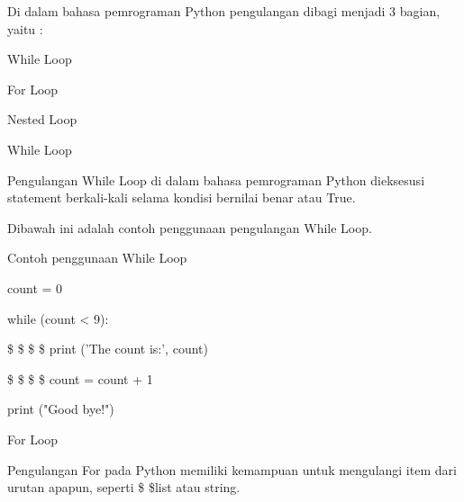 Di dalam bahasa pemrograman Python pengulangan dibagi menjadi 3 bagian, yaitu : \par
\noindent 
While Loop \par
\noindent 
For Loop \par
\noindent 
Nested Loop \par
\noindent 
\vspace{\baselineskip}
\vspace{\baselineskip}
\vspace{12pt}
\noindent 
While Loop \par
\noindent 
Pengulangan While Loop di dalam bahasa pemrograman Python dieksesusi statement berkali-kali selama kondisi bernilai benar atau True. \par
\noindent 
\vspace{\baselineskip}
\vspace{\baselineskip}
Dibawah ini adalah contoh penggunaan pengulangan While Loop. \par
\noindent 
\vspace{\baselineskip}
\vspace{12pt}
\noindent 
Contoh penggunaan While Loop \par
\noindent 
\vspace{\baselineskip}
\vspace{\baselineskip}
count = 0 \par
\noindent 
\vspace{\baselineskip}
while (count < 9): \par
\noindent 
\vspace{\baselineskip}
 \$  \$  \$  \$ print ('The count is:', count) \par
\noindent 
\vspace{\baselineskip}
 \$  \$  \$  \$ count = count + 1 \par
\noindent 
\vspace{\baselineskip}
\vspace{\baselineskip}
print ("Good bye!") \par
\noindent 
\vspace{\baselineskip}
\vspace{\baselineskip}
\vspace{\baselineskip}
\vspace{12pt}
\noindent 
For Loop \par
\noindent 
Pengulangan For pada Python memiliki kemampuan untuk mengulangi item dari urutan apapun, seperti \$  \$list atau string. \par
\noindent 
 \vspace{\baselineskip}
